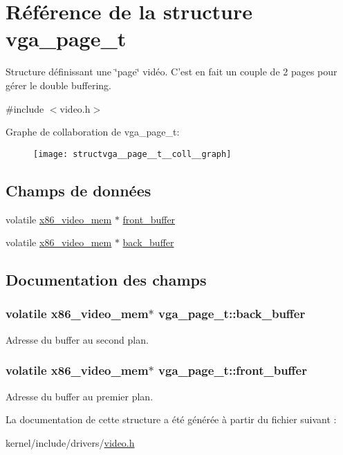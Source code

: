 \hypertarget{structvga__page__t}{\section{Référence de la structure vga\-\_\-page\-\_\-t}
\label{structvga__page__t}
}


Structure définissant une \char`\"{}page\char`\"{} vidéo. C'est en fait un couple de 2 pages pour gérer le double buffering.  




{\ttfamily \#include $<$video.\-h$>$}



Graphe de collaboration de vga\-\_\-page\-\_\-t\-:\nopagebreak
\begin{figure}[H]
\begin{center}
\leavevmode
\texttt{[image: structvga\_\_page\_\_t\_\_coll\_\_graph]}
\end{center}
\end{figure}
\subsection*{Champs de données}
\begin{DoxyCompactItemize}
\item 
volatile \hyperlink{structx86__video__mem}{x86\-\_\-video\-\_\-mem} $\ast$ \hyperlink{structvga__page__t_a8f820f9799bc5f9886e9f74c09e24841}{front\-\_\-buffer}
\item 
volatile \hyperlink{structx86__video__mem}{x86\-\_\-video\-\_\-mem} $\ast$ \hyperlink{structvga__page__t_aaad0350a467498fb34a0b8b1586ac76c}{back\-\_\-buffer}
\end{DoxyCompactItemize}


\subsection{Documentation des champs}
\hypertarget{structvga__page__t_aaad0350a467498fb34a0b8b1586ac76c}{
\subsubsection[{back\-\_\-buffer}]{\setlength{\rightskip}{0pt plus 5cm}volatile {\bf x86\-\_\-video\-\_\-mem}$\ast$ vga\-\_\-page\-\_\-t\-::back\-\_\-buffer}}\label{structvga__page__t_aaad0350a467498fb34a0b8b1586ac76c}
Adresse du buffer au second plan. \hypertarget{structvga__page__t_a8f820f9799bc5f9886e9f74c09e24841}{
\subsubsection[{front\-\_\-buffer}]{\setlength{\rightskip}{0pt plus 5cm}volatile {\bf x86\-\_\-video\-\_\-mem}$\ast$ vga\-\_\-page\-\_\-t\-::front\-\_\-buffer}}\label{structvga__page__t_a8f820f9799bc5f9886e9f74c09e24841}
Adresse du buffer au premier plan. 

La documentation de cette structure a été générée à partir du fichier suivant \-:\begin{DoxyCompactItemize}
\item 
kernel/include/drivers/\hyperlink{video_8h}{video.\-h}\end{DoxyCompactItemize}
